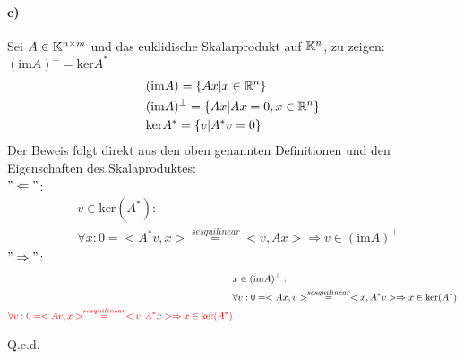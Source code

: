 \paragraph*{c)}
Sei $A \in \mathbb K^{n\times m}$ und das euklidische Skalarprodukt auf $\mathbb K^n$, zu zeigen: $(\mathrm{im} A)^\perp = \mathrm{ker} A^*$\\
\begin{align}
&(\mathrm{im} A) = \{Ax|x \in \mathbb R^n\}\\
&(\mathrm{im} A)^\perp = \{Ax|Ax=0,x \in \mathbb R^n\}\\
&\mathrm{ker} A^*=\{v| A^*v=0\}
\end{align}
Der Beweis folgt direkt aus den oben genannten Definitionen und den Eigenschaften des Skalaproduktes:\\
\newline
$"\Leftarrow"$:
\begin{align}
&v \in \mathrm{ker}(A^*):\\
&\forall x: 0 = <A^*v,x>\overset{sesquilinear}{=} <v, Ax> \Rightarrow v \in (\mathrm{im} A)^\perp
\end{align}
$"\Rightarrow"$:
\begin{align}
&x \in (\mathrm{im} A)^\perp:\\
&\forall v:0=<Ax,v> \overset{sesquilinear}{=} <x, A^*v> \Rightarrow x \in \mathrm{ker}(A^*)\\
\textcolor{red}{\forall v:0=<Av,x> \overset{sesquilinear}{=} <v, A^*x> \Rightarrow x \in \mathrm{ker}(A^*)}
\end{align}
\begin{flushright}Q.e.d.\end{flushright}


